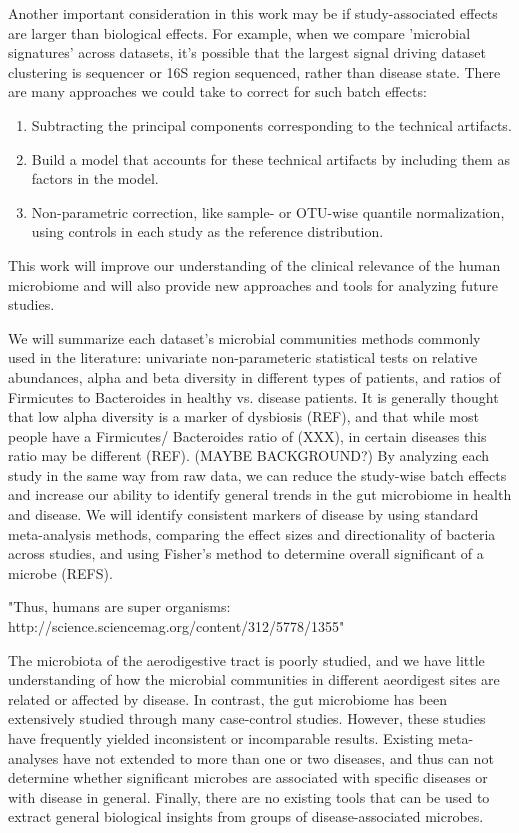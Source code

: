 \documentclass[12pt]{article}
\begin{document}
Another important consideration in this work may be if study-associated effects are larger than biological effects. For example, when we compare 'microbial signatures' across datasets, it's possible that the largest signal driving dataset clustering is sequencer or 16S region sequenced, rather than disease state. There are many approaches we could take to correct for such batch effects:
\begin{enumerate}
	\item Subtracting the principal components corresponding to the technical artifacts.
	\item Build a model that accounts for these technical artifacts by including them as factors in the model.
	\item Non-parametric correction, like sample- or OTU-wise quantile normalization, using controls in each study as the reference distribution.
\end{enumerate}

This work will improve our 
understanding of the clinical relevance of the human microbiome and 
will also provide new approaches and tools for analyzing future 
studies.

We will summarize each dataset's microbial communities
methods commonly used in the 
literature: univariate non-parameteric statistical tests on relative 
abundances, alpha and beta diversity in different types of patients, 
and ratios of Firmicutes to Bacteroides in healthy vs. disease 
patients. It is generally thought that low alpha diversity is a marker 
of dysbiosis (REF), and that while most people have a Firmicutes/
Bacteroides ratio of (XXX), in certain diseases this ratio may be 
different (REF). (MAYBE BACKGROUND?) By analyzing each study in the 
same way from raw data, we can reduce the study-wise batch effects and 
increase our ability to identify general trends in the gut microbiome 
in health and disease. We will identify consistent markers of disease 
by using standard meta-analysis methods, comparing the effect sizes 
and directionality of bacteria across studies, and using Fisher's 
method to determine overall significant of a microbe (REFS). 

"Thus, humans are super organisms: http://science.sciencemag.org/content/312/5778/1355"

The microbiota of 
the aerodigestive tract is poorly studied, and we have little understanding 
of how the microbial communities in different aeordigest sites are related or 
affected by disease. In contrast, the gut microbiome has 
been extensively studied through many case-control studies. 
However, these studies have frequently yielded inconsistent or incomparable 
results. Existing meta-analyses have not extended to more than one or two 
diseases, and thus can not determine whether significant microbes are 
associated with specific diseases or with disease in general. 
Finally, there are no existing tools that can be used to extract general 
biological insights from groups of disease-associated microbes.
\end{document}
